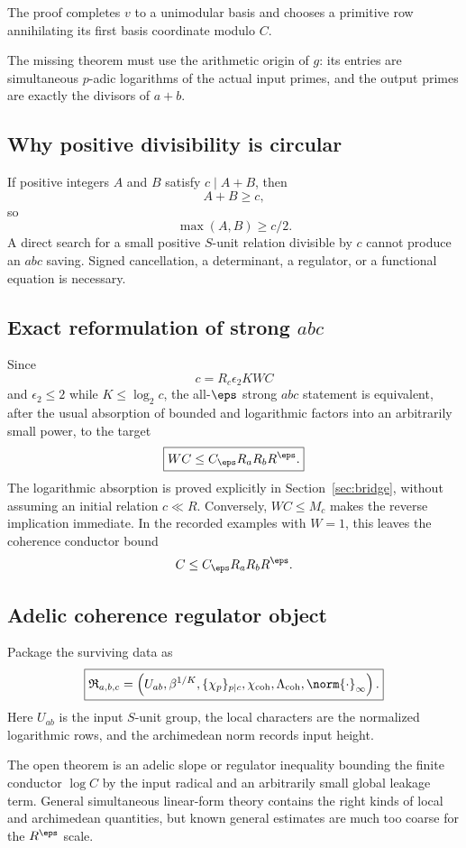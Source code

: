 The proof completes $v$ to a unimodular basis and chooses a primitive row annihilating its first basis coordinate modulo $C$.

The missing theorem must use the arithmetic origin of $g$: its entries are simultaneous $p$-adic logarithms of the actual input primes, and the output primes are exactly the divisors of $a+b$.

\subsection{Why positive divisibility is circular}
If positive integers $A$ and $B$ satisfy $c\mid A+B$, then
\[
 A+B\ge c,
\]
so
\[
 \max(A,B)\ge c/2.
\]
A direct search for a small positive $S$-unit relation divisible by $c$ cannot produce an $abc$ saving. Signed cancellation, a determinant, a regulator, or a functional equation is necessary.

\subsection{Exact reformulation of strong \texorpdfstring{$abc$}{abc}}
Since
\[
 c=R_c\epsilon_2KWC
\]
and $\epsilon_2\le2$ while $K\le\log_2c$, the all-$\eps$ strong $abc$ statement is equivalent, after the usual absorption of bounded and logarithmic factors into an arbitrarily small power, to the target
\[
 \boxed{
 WC
 \le
 C_\eps R_aR_bR^\eps.
 }
\]
The logarithmic absorption is proved explicitly in Section~\ref{sec:bridge}, without assuming an initial relation $c\ll R$. Conversely, $WC\le M_c$ makes the reverse implication immediate. In the recorded examples with $W=1$, this leaves the coherence conductor bound
\[
 C\le C_\eps R_aR_bR^\eps.
\]

\subsection{Adelic coherence regulator object}
Package the surviving data as
\[
 \boxed{
 \mathfrak R_{a,b,c}
 =
 \left(
 U_{ab},
 \beta^{1/K},
 \{\chi_p\}_{p\mid c},
 \chi_{\mathrm{coh}},
 \Lambda_{\mathrm{coh}},
 \norm{\cdot}_\infty
 \right).
 }
\]
Here $U_{ab}$ is the input $S$-unit group, the local characters are the normalized logarithmic rows, and the archimedean norm records input height.

The open theorem is an adelic slope or regulator inequality bounding the finite conductor $\log C$ by the input radical and an arbitrarily small global leakage term. General simultaneous linear-form theory contains the right kinds of local and archimedean quantities, but known general estimates are much too coarse for the $R^\eps$ scale.

